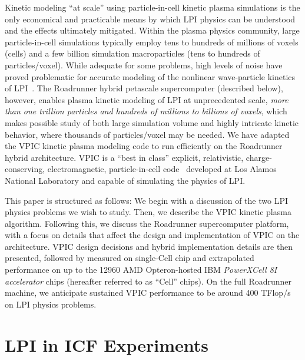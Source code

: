 \documentclass[10pt]{article}
\begin{document}
Kinetic modeling ``at scale'' using particle-in-cell kinetic plasma simulations is 
the only economical and practicable means by which LPI physics can be understood 
and the effects ultimately mitigated.  
Within the plasma physics community, large particle-in-cell simulations 
typically employ tens to hundreds of millions of voxels (cells) and a few 
billion simulation macroparticles (tens to hundreds of particles/voxel).  
While adequate for some problems, high levels of noise have proved problematic 
for accurate modeling of the nonlinear wave-particle kinetics of 
LPI~\cite{Yin_et_al_Phys_Plasmas_2006}.  
The Roadrunner hybrid petascale supercomputer (described below), however, 
enables plasma kinetic modeling of LPI at unprecedented 
scale, \textit{more than one trillion particles and hundreds of millions 
to billions of voxels}, which makes possible study of both large simulation 
volume and highly intricate kinetic behavior, where thousands of particles/voxel 
may be needed.  
We have adapted the VPIC kinetic plasma modeling code to run efficiently on the
Roadrunner hybrid architecture.  VPIC is a ``best in class'' explicit, relativistic, 
charge-conserving, electromagnetic, particle-in-cell code~\cite{Bowers_et_al_Phys_Plasmas_2007} developed at
Los Alamos National Laboratory and capable of simulating the physics of LPI. 

This paper is structured as follows:  We begin with a discussion of the two LPI 
physics problems we wish to study.  Then, we describe the VPIC 
kinetic plasma algorithm.  Following this, we discuss the Roadrunner supercomputer platform, 
with a focus on details that affect the design and implementation of
VPIC on the architecture.   VPIC design decisions and hybrid implementation details 
are then presented, followed by measured on single-Cell chip and extrapolated performance 
on up to the 12960 AMD Opteron-hosted IBM \emph{PowerXCell 8I accelerator} chips (hereafter 
referred to as ``Cell'' chips).  On the full Roadrunner machine, we anticipate 
sustained VPIC performance to be around 400 TFlop/s on LPI physics problems. 



\section*{LPI in ICF Experiments}
\end{document}
